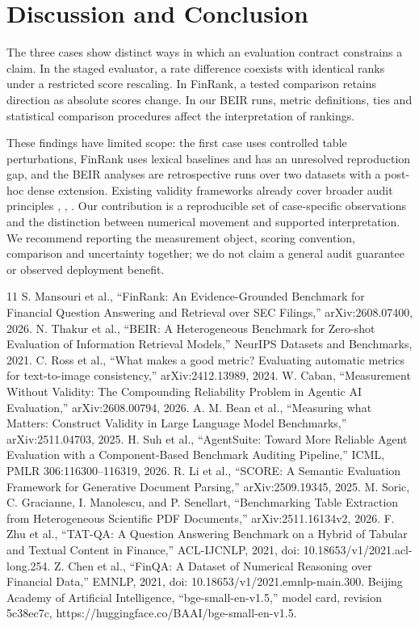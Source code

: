 \documentclass[runningheads]{llncs}
\begin{document}
\section{Discussion and Conclusion}\label{discussion-and-conclusion}

The three cases show distinct ways in which an evaluation contract
constrains a claim. In the staged evaluator, a rate difference coexists
with identical ranks under a restricted score rescaling. In FinRank, a
tested comparison retains direction as absolute scores change. In our
BEIR runs, metric definitions, ties and statistical comparison
procedures affect the interpretation of rankings.

These findings have limited scope: the first case uses controlled table
perturbations, FinRank uses lexical baselines and has an unresolved
reproduction gap, and the BEIR analyses are retrospective runs over two
datasets with a post-hoc dense extension. Existing validity frameworks
already cover broader audit principles \cite{r3}, \cite{r4}, \cite{r5}.
Our contribution is a reproducible set of case-specific observations and
the distinction between numerical movement and supported interpretation.
We recommend reporting the measurement object, scoring convention,
comparison and uncertainty together; we do not claim a general audit
guarantee or observed deployment benefit.
\begin{thebibliography}{11}
 S. Mansouri et al., ``FinRank: An Evidence-Grounded Benchmark for
Financial Question Answering and Retrieval over SEC Filings,''
arXiv:2608.07400, 2026.
 N. Thakur et al., ``BEIR: A Heterogeneous Benchmark for Zero-shot
Evaluation of Information Retrieval Models,'' NeurIPS Datasets and
Benchmarks, 2021.
 C. Ross et al., ``What makes a good metric? Evaluating automatic metrics
for text-to-image consistency,'' arXiv:2412.13989, 2024.
 W. Caban, ``Measurement Without Validity: The Compounding Reliability
Problem in Agentic AI Evaluation,'' arXiv:2608.00794, 2026.
 A. M. Bean et al., ``Measuring what Matters: Construct Validity in Large
Language Model Benchmarks,'' arXiv:2511.04703, 2025.
 H. Suh et al., ``AgentSuite: Toward More Reliable Agent Evaluation with
a Component-Based Benchmark Auditing Pipeline,'' ICML, PMLR
306:116300--116319, 2026.
 R. Li et al., ``SCORE: A Semantic Evaluation Framework for Generative
Document Parsing,'' arXiv:2509.19345, 2025.
 M. Soric, C. Gracianne, I. Manolescu, and P. Senellart, ``Benchmarking
Table Extraction from Heterogeneous Scientific PDF Documents,''
arXiv:2511.16134v2, 2026.
 F. Zhu et al., ``TAT-QA: A Question Answering Benchmark on a Hybrid of
Tabular and Textual Content in Finance,'' ACL-IJCNLP, 2021, doi:
10.18653/v1/2021.acl-long.254.
 Z. Chen et al., ``FinQA: A Dataset of Numerical Reasoning over Financial
Data,'' EMNLP, 2021, doi: 10.18653/v1/2021.emnlp-main.300.
 Beijing Academy of Artificial Intelligence, ``bge-small-en-v1.5,'' model
card, revision 5c38ec7c, https://huggingface.co/BAAI/bge-small-en-v1.5.
\end{thebibliography}
\end{document}
